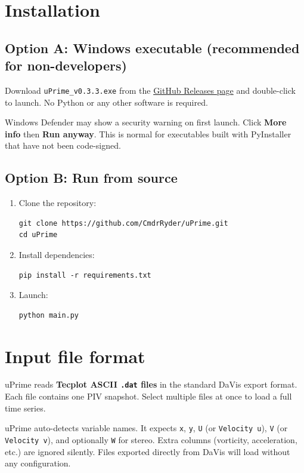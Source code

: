 \documentclass[11pt, a4paper]{report}
\begin{document}
\section{Installation}

\subsection{Option A: Windows executable (recommended for non-developers)}

Download \texttt{uPrime\_v0.3.3.exe} from the
\href{https://github.com/CmdrRyder/uPrime/releases}{GitHub Releases page}
and double-click to launch. No Python or any other software is required.

\begin{notebox}
Windows Defender may show a security warning on first launch. Click \textbf{More info} then \textbf{Run anyway}. This is normal for executables built with PyInstaller that have not been code-signed.
\end{notebox}

\subsection{Option B: Run from source}

\begin{enumerate}[leftmargin=1.5em]
  \item Clone the repository:
\begin{verbatim}
git clone https://github.com/CmdrRyder/uPrime.git
cd uPrime
\end{verbatim}
  \item Install dependencies:
\begin{verbatim}
pip install -r requirements.txt
\end{verbatim}
  \item Launch:
\begin{verbatim}
python main.py
\end{verbatim}
\end{enumerate}

\section{Input file format}

uPrime reads \textbf{Tecplot ASCII \texttt{.dat} files} in the standard DaVis export format. Each file contains one PIV snapshot. Select multiple files at once to load a full time series.

\begin{notebox}
uPrime auto-detects variable names. It expects \texttt{x}, \texttt{y}, \texttt{U} (or \texttt{Velocity u}), \texttt{V} (or \texttt{Velocity v}), and optionally \texttt{W} for stereo. Extra columns (vorticity, acceleration, etc.) are ignored silently. Files exported directly from DaVis will load without any configuration.
\end{notebox}
\end{document}
